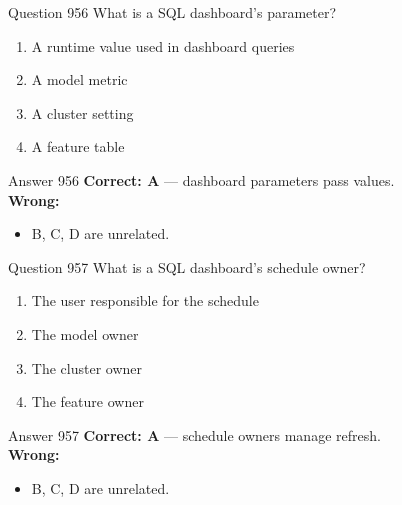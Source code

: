 \documentclass[aspectratio=169,11pt]{beamer}
\begin{document}
	\begin{frame}{Question 956}
		What is a SQL dashboard's parameter?
		\begin{enumerate}[label=\Alph*.]
			\item A runtime value used in dashboard queries
			\item A model metric
			\item A cluster setting
			\item A feature table
		\end{enumerate}
	\end{frame}
	\begin{frame}{Answer 956}
		\textbf{Correct: A} --- dashboard parameters pass values.\\
		\vspace{0.5em}
		\textbf{Wrong:}
		\begin{itemize}
			\item B, C, D are unrelated.
		\end{itemize}
	\end{frame}
	
	\begin{frame}{Question 957}
		What is a SQL dashboard's schedule owner?
		\begin{enumerate}[label=\Alph*.]
			\item The user responsible for the schedule
			\item The model owner
			\item The cluster owner
			\item The feature owner
		\end{enumerate}
	\end{frame}
	\begin{frame}{Answer 957}
		\textbf{Correct: A} --- schedule owners manage refresh.\\
		\vspace{0.5em}
		\textbf{Wrong:}
		\begin{itemize}
			\item B, C, D are unrelated.
		\end{itemize}
	\end{frame}
	
\end{document}
